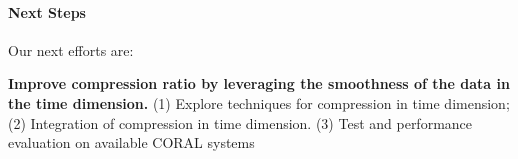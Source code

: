 \paragraph{Next Steps} Our next efforts are: 

\textbf{Improve compression ratio by leveraging the smoothness of the data in the time dimension.} (1) Explore techniques for compression in time dimension; (2) Integration of compression in time dimension. (3) Test and performance evaluation on available CORAL systems

